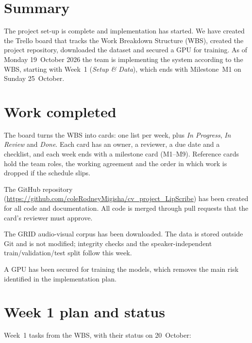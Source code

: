 \documentclass[11pt,a4paper]{article}
\begin{document}

\section{Summary}
The project set-up is complete and implementation has started. We have created
the Trello board that tracks the Work Breakdown Structure (WBS), created the
project repository, downloaded the dataset and secured a GPU for training. As
of Monday 19~October 2026 the team is implementing the system according to the
WBS, starting with Week~1 (\emph{Setup \& Data}), which ends with Milestone~M1
on Sunday 25~October.

\section{Work completed}

\begin{description}[style=nextline,leftmargin=0pt,itemsep=4pt]
  \item[Trello board]
    The board turns the WBS into cards: one list per week, plus
    \emph{In Progress}, \emph{In Review} and \emph{Done}. Each card has an
    owner, a reviewer, a due date and a checklist, and each week ends with a
    milestone card (M1--M9). Reference cards hold the team roles, the working
    agreement and the order in which work is dropped if the schedule slips.
  \item[Code repository]
    The GitHub repository
    (\url{https://github.com/coleRodneyMigisha/cv_project_LipScribe}) has been
    created for all code and documentation. All code is merged through pull
    requests that the card's reviewer must approve.
  \item[Dataset]
    The GRID audio-visual corpus has been downloaded. The data is stored
    outside Git and is not modified; integrity checks and the
    speaker-independent train/validation/test split follow this week.
  \item[GPU for training]
    A GPU has been secured for training the models, which removes the main risk
    identified in the implementation plan.
\end{description}

\section{Week 1 plan and status}
Week~1 tasks from the WBS, with their status on 20~October:
\end{document}
